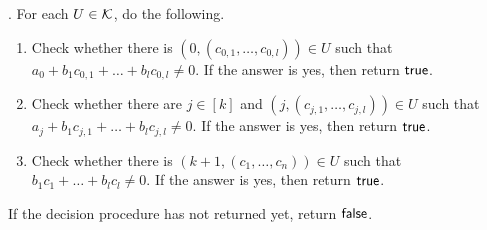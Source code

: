 . For each $U \in {\mathcal{K}}$, do the following.
\begin{enumerate}
\item Check whether there is $(0,(c_{0,1},\dots,c_{0,l})) \in U$ such that $a_0+b_1 c_{0,1}+\dots + b_l c_{0,l} \neq 0$. If the answer is yes, then return $\mathsf{true}$.
%
\item Check whether there are $j \in [k]$ and $(j, (c_{j,1},\dots,c_{j,l})) \in U$ such that $a_j + b_1 c_{j,1} + \dots + b_l c_{j,l} \neq 0$. If the answer is yes, then return $\mathsf{true}$. 
%
\item Check whether there is $(k+1,(c_1,\dots,c_n)) \in U$ such that $b_1 c_1 + \dots + b_l c_l \neq 0$. If the answer is yes, then return $\mathsf{true}$. 
\end{enumerate}
If the decision procedure has not returned yet, return $\mathsf{false}$.



%
%
%
%

